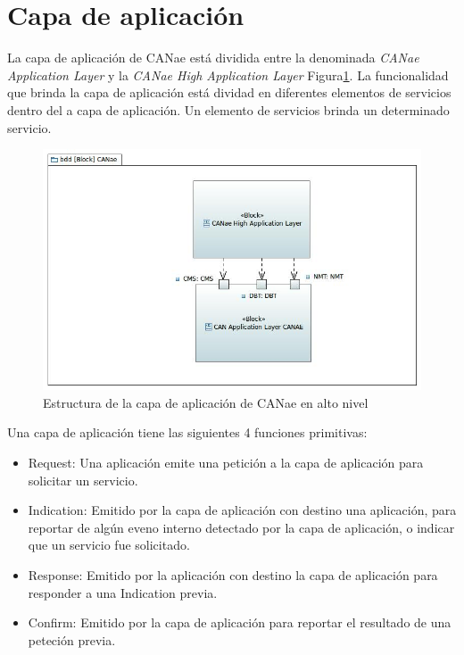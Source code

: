 \section{Capa de aplicación}
La capa de aplicación de CANae está dividida entre la denominada \textit{CANae Application Layer} y la \textit{CANae High Application Layer} Figura\ref{fig:CANAE}. La funcionalidad que brinda la capa de aplicación está dividad en diferentes elementos de servicios dentro del a capa de aplicación. Un elemento de servicios brinda un determinado servicio.

\begin{figure}[h!]
 \centering
 \includegraphics[scale=0.5]{images/Secciones/AppendixA/CANAE.jpg}
  \caption{Estructura de la capa de aplicación de CANae en alto nivel}
\label{fig:CANAE}
\end{figure}

Una capa de aplicación tiene las siguientes 4 funciones primitivas:
\begin{itemize}
\item Request: Una aplicación emite una petición a la capa de aplicación para solicitar un servicio.
  
\item Indication: Emitido por la capa de aplicación con destino una aplicación, para reportar de algún eveno interno detectado por la capa de aplicación, o indicar que un servicio fue solicitado.

\item Response: Emitido por la aplicación con destino la capa de aplicación para responder a una Indication previa.

\item Confirm: Emitido por la capa de aplicación para reportar el resultado de una peteción previa. 
\end{itemize}

